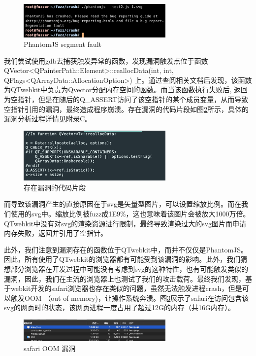 \documentclass[doctor,privacy,twoside]{buaa_mac}
\begin{document}
\centerline{}
\begin{figure}[!h]
  \centering
  \includegraphics[width=0.68\textwidth]{images/seg_fault.png}
  \caption{PhantomJS segment fault}
  \label{fig:segment}
\end{figure}


我们尝试使用gdb去捕获触发异常的函数，发现漏洞触发点位于函数 QVector<QPainterPath::Element>::reallocData(int, int, QFlags<QArrayData::AllocationOption>) 上。通过查阅相关文档后发现，该函数为QTwebkit中负责为Qvector分配内存空间的函数。而当该函数执行失败后, 返回为空指针，但是在随后的Q\_{}ASSERT访问了该空指针的某个成员变量，从而导致空指针引用的漏洞，最终造成程序崩溃。存在漏洞的代码片段如图\ref{fig:vuln}所示，具体的漏洞分析过程详情见附录C。


\centerline{}
\begin{figure}[!h]
  \centering
  \includegraphics[width=0.68\textwidth]{images/vuln_func.png}
  \caption{存在漏洞的代码片段}
  \label{fig:vuln}
\end{figure}



而导致该漏洞产生的直接原因在于svg是矢量型图片，可以设置缩放比例。而在我们使用的svg中。缩放比例被fuzz成1E9\%，这也意味着该图片会被放大1000万倍。QTwebkit中没有对svg的渲染资源进行限制，最终导致渲染过大的svg图片而申请内存失败，返回并引用了空指针。

此外，我们注意到漏洞存在的函数位于QTwebkit中，而并不仅仅是PhantomJS。因此，所有使用了QTwebkit的浏览器都有可能受到该漏洞的影响。此外，我们猜想部分浏览器在开发过程中可能没有考虑到svg的这种特性，也有可能触发类似的漏洞，因此，我们在主流的浏览器上也测试了我们的攻击载荷。最终我们发现，基于webkit开发的safari浏览器也存在类似的问题，虽然无法触发进程crash，但是可以触发OOM （out of memory)，让操作系统奔溃。图\ref{fig:oom}展示了safari在访问包含该svg的网页时的状态，该网页进程一度占用了超过12G的内存（共16G内存）。

\centerline{}
\begin{figure}[!h]
  \centering
  \includegraphics[width=0.68\textwidth]{images/safari_oom.jpg}
  \caption{safari OOM 漏洞}
  \label{fig:oom}
\end{figure}
\end{document}

